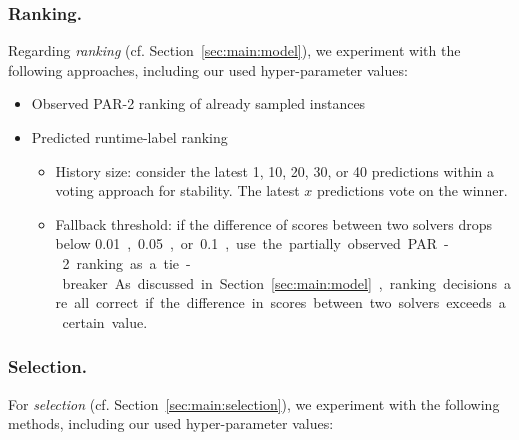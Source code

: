 \documentclass[runningheads]{llncs}
\begin{document}
\subsubsection{Ranking.}

Regarding \emph{ranking} (cf. Section~\ref{sec:main:model}), we experiment with the following approaches, including our used hyper-parameter values:

\begin{itemize}
  \item Observed PAR-2 ranking of already sampled instances
  \item Predicted runtime-label ranking
  \begin{itemize}
    \item
    History size: consider the latest 1, 10, 20, 30, or 40 predictions within a voting approach for stability.
    The latest $x$ predictions vote on the winner.
    \item
    Fallback threshold: if the difference of scores between two solvers drops below \SI{0.01}, \SI{0.05}, or \SI{0.1}, use the partially observed PAR-2 ranking as a tie-breaker.
    As discussed in Section~\ref{sec:main:model}, ranking decisions are all correct if the difference in scores between two solvers exceeds a certain value.
  \end{itemize}
\end{itemize}

\subsubsection{Selection.}

For \emph{selection} (cf. Section~\ref{sec:main:selection}), we experiment with the following methods, including our used hyper-parameter values:
\end{document}
